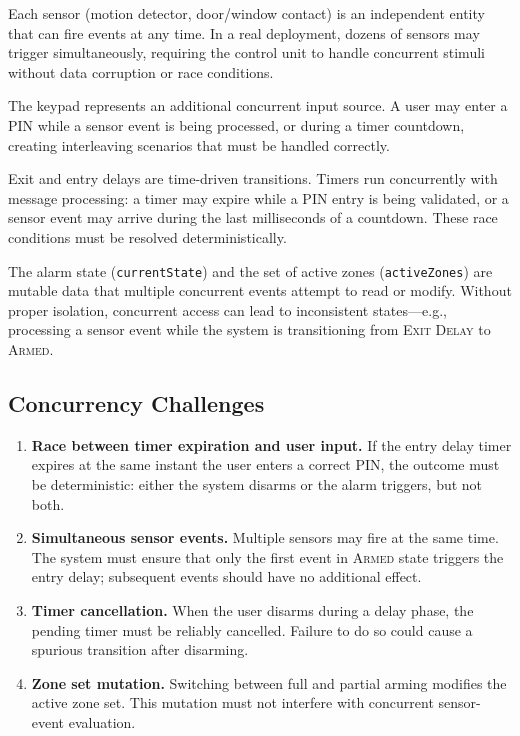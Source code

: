 \documentclass[a4paper, 12pt]{article}
\begin{document}
\begin{description}[style=nextline]
  \item[Multiple Sensors]
    Each sensor (motion detector, door/window contact) is an independent entity that can fire events at any time. In a real deployment, dozens of sensors may trigger simultaneously, requiring the control unit to handle concurrent stimuli without data corruption or race conditions.

  \item[User Interaction]
    The keypad represents an additional concurrent input source. A user may enter a PIN while a sensor event is being processed, or during a timer countdown, creating interleaving scenarios that must be handled correctly.

  \item[Timer Management]
    Exit and entry delays are time-driven transitions. Timers run concurrently with message processing: a timer may expire while a PIN entry is being validated, or a sensor event may arrive during the last milliseconds of a countdown. These race conditions must be resolved deterministically.

  \item[State Consistency]
    The alarm state (\texttt{currentState}) and the set of active zones (\texttt{activeZones}) are mutable data that multiple concurrent events attempt to read or modify. Without proper isolation, concurrent access can lead to inconsistent states---e.g., processing a sensor event while the system is transitioning from \textsc{Exit Delay} to \textsc{Armed}.
\end{description}

\subsection{Concurrency Challenges}

\begin{enumerate}[label=\textbf{C\arabic*.}]
  \item \textbf{Race between timer expiration and user input.} If the entry delay timer expires at the same instant the user enters a correct PIN, the outcome must be deterministic: either the system disarms or the alarm triggers, but not both.
  \item \textbf{Simultaneous sensor events.} Multiple sensors may fire at the same time. The system must ensure that only the first event in \textsc{Armed} state triggers the entry delay; subsequent events should have no additional effect.
  \item \textbf{Timer cancellation.} When the user disarms during a delay phase, the pending timer must be reliably cancelled. Failure to do so could cause a spurious transition after disarming.
  \item \textbf{Zone set mutation.} Switching between full and partial arming modifies the active zone set. This mutation must not interfere with concurrent sensor-event evaluation.
\end{enumerate}
\end{document}
